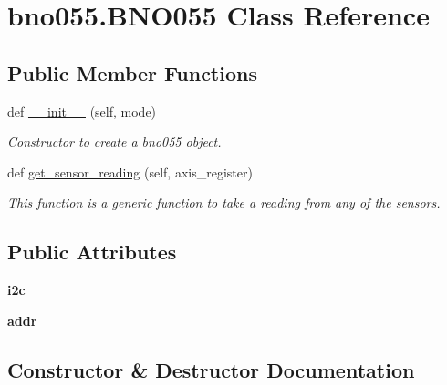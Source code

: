 \hypertarget{classbno055_1_1_b_n_o055}{}\section{bno055.\+B\+N\+O055 Class Reference}
\label{classbno055_1_1_b_n_o055}
\subsection*{Public Member Functions}
\begin{DoxyCompactItemize}
\item 
def \mbox{\hyperlink{classbno055_1_1_b_n_o055_a7c9d3511b593522191a131e31d22761a}{\+\_\+\+\_\+init\+\_\+\+\_\+}} (self, mode)
\begin{DoxyCompactList}\small\item\em Constructor to create a bno055 object. \end{DoxyCompactList}\item 
def \mbox{\hyperlink{classbno055_1_1_b_n_o055_a8930cf974921f89580761cad8881e9d8}{get\+\_\+sensor\+\_\+reading}} (self, axis\+\_\+register)
\begin{DoxyCompactList}\small\item\em This function is a generic function to take a reading from any of the sensors. \end{DoxyCompactList}\end{DoxyCompactItemize}
\subsection*{Public Attributes}
\begin{DoxyCompactItemize}
\item 
\mbox{\label{classbno055_1_1_b_n_o055_a6e4029bdf98339217b2ca55ae0263dfa}} 
{\bfseries i2c}
\item 
\mbox{\label{classbno055_1_1_b_n_o055_a994806612bbcd4436c69d5136affea3f}} 
{\bfseries addr}
\end{DoxyCompactItemize}


\subsection{Constructor \& Destructor Documentation}
\mbox{\label{classbno055_1_1_b_n_o055_a7c9d3511b593522191a131e31d22761a}} 
